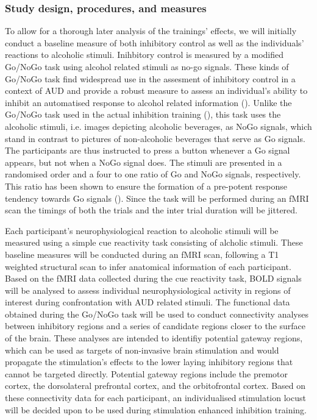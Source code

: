 \documentclass[12pt]{article}
\begin{document}
\lipsum[1-2]

\subsubsection{Study design, procedures, and measures}

To allow for a thorough later analysis of the trainings' effects, we will initially conduct a baseline measure of both inhibitory control as well as the individuals' reactions to alcoholic stimuli. Inihbitory control is measured by a modified Go/NoGo task using alcohol related stimuli as no-go signals. These kinds of Go/NoGo task find widespread use in the assesment of inhibitory control in a context of AUD and provide a robust measure to assess an individual's ability to inhibit an automatised response to alcohol related information (\cite{amesNeuralCorrelatesGo2014,bowleyEffectsInhibitoryControl2013,roseEffectsAlcoholInhibitory2008,simmondsMetaanalysisGoNogo2008}). Unlike the Go/NoGo task used in the actual inhibition training (\cite{houbenBeerNogoLearning2012}), this task uses the alcoholic stimuli, i.e. images depicting alcoholic beverages, as NoGo signals, which stand in contrast to pictures of non-alcoholic beverages that serve as Go signals. The participants are thus instructed to press a button whenever a Go signal appears, but not when a NoGo signal does. The stimuli are presented in a randomised order and a four to one ratio of Go and NoGo signals, respectively. This ratio has been shown to ensure the formation of a pre-potent response tendency towards Go signals (\cite{amesNeuralCorrelatesGo2014}). Since the task will be performed during an fMRI scan the timings of both the trials and the inter trial duration will be jittered.

Each participant's neurophysiological reaction to alcoholic stimuli will be measured using a simple cue reactivity task consisting of alcholic stimuli. These baseline measures will be conducted during an fMRI scan, following a T1 weighted structural scan to infer anatomical information of each participant.
Based on the fMRI data collected during the cue reactivity task, BOLD signals will be analysed to assess individual neurophysiological activity in regions of interest during confrontation with AUD related stimuli. The functional data obtained during the Go/NoGo task will be used to conduct connectivity analyses between inhibitory regions and a series of candidate regions closer to the surface of the brain. These analyses are intended to identifiy potential gateway regions, which can be used as targets of non-invasive brain stimulation and would propagate the stimulation's effects to the lower laying inhibitory regions that cannot be targeted directly. Potential gateway regions include the premotor cortex, the dorsolateral prefrontal cortex, and the orbitofrontal cortex. Based on these connectivity data for each participant, an individualised stimulation locust will be decided upon to be used during stimulation enhanced inhibition training.
\end{document}
